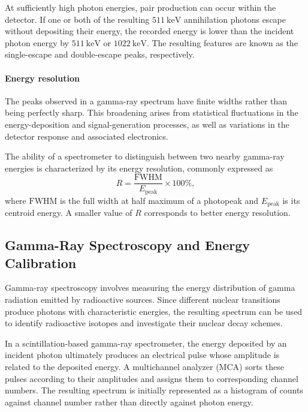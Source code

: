 At sufficiently high photon energies, pair production can occur within the detector. If one or both of the resulting $511~\mathrm{keV}$ annihilation photons escape without depositing their energy, the recorded energy is lower than the incident photon energy by $511~\mathrm{keV}$ or $1022~\mathrm{keV}$. The resulting features are known as the single-escape and double-escape peaks, respectively.

\paragraph{Energy resolution}

The peaks observed in a gamma-ray spectrum have finite widths rather than being perfectly sharp. This broadening arises from statistical fluctuations in the energy-deposition and signal-generation processes, as well as variations in the detector response and associated electronics.

The ability of a spectrometer to distinguish between two nearby gamma-ray energies is characterized by its energy resolution, commonly expressed as
\begin{equation}
    R=\frac{\mathrm{FWHM}}{E_{\mathrm{peak}}}\times 100\%,
\end{equation}
where $\mathrm{FWHM}$ is the full width at half maximum of a photopeak and $E_{\mathrm{peak}}$ is its centroid energy. A smaller value of $R$ corresponds to better energy resolution.

\subsection{Gamma-Ray Spectroscopy and Energy Calibration}

Gamma-ray spectroscopy involves measuring the energy distribution of gamma radiation emitted by radioactive sources. Since different nuclear transitions produce photons with characteristic energies, the resulting spectrum can be used to identify radioactive isotopes and investigate their nuclear decay schemes.

In a scintillation-based gamma-ray spectrometer, the energy deposited by an incident photon ultimately produces an electrical pulse whose amplitude is related to the deposited energy. A multichannel analyzer (MCA) sorts these pulses according to their amplitudes and assigns them to corresponding channel numbers. The resulting spectrum is initially represented as a histogram of counts against channel number rather than directly against photon energy.

